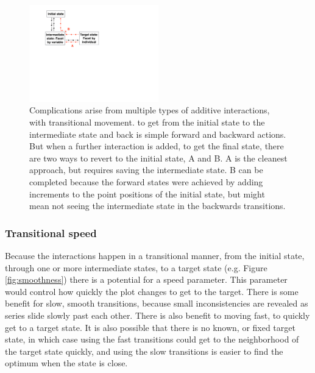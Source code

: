 \documentclass[12pt]{article}
\begin{document}
\begin{center}
\begin{figure}[H]
\begin{centering}
\includegraphics[width=0.5\textwidth]{graph/additivity.pdf}
\par\end{centering}

\caption{\label{fig:additive-interactions}
Complications arise from multiple types of additive interactions, with transitional movement. to get from the initial state to the intermediate state and back is simple forward and backward actions. But when a further interaction is added, to get the final state, there are two ways to revert to the initial state, A and B. A is the cleanest approach, but requires saving the intermediate state. B can be completed because the forward states were achieved by adding increments to the point positions of the initial state, but might mean not seeing the intermediate state in the backwards transitions.}
\end{figure}

\par\end{center}


\subsubsection{Transitional speed}

Because the interactions happen in a transitional manner, from
the initial state, through one or more intermediate states, to
a target state  (e.g. Figure \ref{fig:smoothness}) there is a
potential for a speed parameter. This parameter would control
how quickly the plot changes to get to the target. There is
some benefit for slow, smooth transitions, because small
inconsistencies are revealed as series slide slowly past
each other. There is also benefit to moving fast, to quickly
get to a target state. It is also possible that there is no
known, or fixed target state, in which case using the fast
transitions could get to the neighborhood of the target state
quickly, and using the slow transitions is easier to find the
optimum when the state is close.
\end{document}
